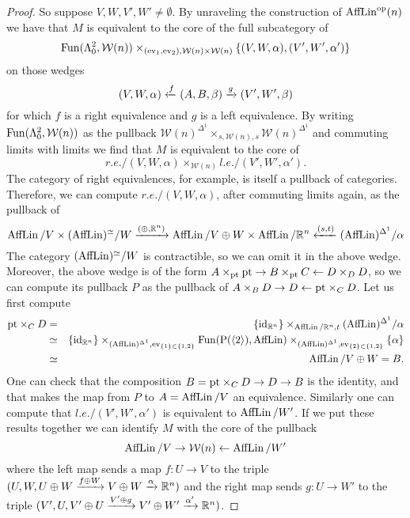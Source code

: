 \begin{proof}
    So suppose $V,W,V',W' \neq \emptyset$. By unraveling the construction of
    $\operatorname{AffLin}^{\mathrm{op}}(n)$ we have that $M$ is equivalent to the core of the
    full subcategory of
    \[
      \operatorname{Fun}(\Lambda^2_0, {\mathcal W(n)}) \times_{(\mathrm{ev}_1,\mathrm{ev}_2),
        {\mathcal W(n)}\times {\mathcal W(n)}} \{(V,W,\alpha),(V',W',\alpha')\}
    \]
    on those wedges
    \[
      (V,W,\alpha) \xleftarrow{f} (A,B,\beta) \xrightarrow{g} (V',W',\beta)
    \]
    for which $f$ is a right equivalence and $g$ is a left equivalence.
    By writing $ \operatorname{Fun}(\Lambda^2_0, {\mathcal W(n)}) $ as the
    pullback ${\mathcal W(n)}^{\Delta^1} \times_{s,{\mathcal W(n)},s} {\mathcal W(n)}^{\Delta^1}$
    and commuting limits with limits we find that $M$ is equivalent to the core of
    \[
      r.e./(V,W,\alpha) \times_{{\mathcal W(n)}} l.e./(V',W',\alpha').
    \]
    The category of right equivalences, for example,
    is itself a pullback of categories.
    Therefore, we can compute $r.e./(V,W,\alpha)$, after
    commuting limits again, as the pullback of
    \[
      \operatorname{AffLin}/V \times (\operatorname{AffLin})^\simeq/W \xrightarrow{(\oplus, \mathbb{R}^n)} \operatorname{AffLin}/V\oplus W \times
      \operatorname{AffLin}/\mathbb{R}^n \xleftarrow{(s,t)} (\operatorname{AffLin})^{\Delta^1}/\alpha
    \]
    The category $(\operatorname{AffLin})^\simeq/W$ is contractible, so we can omit it in the above wedge.
    Moreover, the above wedge is of the form
    $A \times_{\mathrm{pt}} \mathrm{pt} \to B \times_{\mathrm{pt}} C \leftarrow D \times_D D$,
    so we can compute its pullback $P$ as the
    pullback of  $A \times_B D \to D \leftarrow \mathrm{pt} \times_C D$.
    Let us first compute
    \begin{eqnarray*}
      \mathrm{pt} \times_C D &=& \{\mathrm{id}_{\mathbb{R}^n}\} \times_{\operatorname{AffLin}/\mathbb{R}^n,t} (\operatorname{AffLin})^{\Delta^1}/\alpha \\
      & \simeq & \{\mathrm{id}_{\mathbb{R}^n}\} \times_{(\operatorname{AffLin})^{\Delta^1}, \mathrm{ev}_{\{1\} \subset \{1,2\} }}
      \operatorname{Fun}(\mathrm{P}(\langle 2 \rangle), \operatorname{AffLin})
      \times_{(\operatorname{AffLin})^{\Delta^1}, \mathrm{ev}_{\{2\} \subset \{1,2\} }} \{\alpha \} \\
      & \simeq & \operatorname{AffLin} / V \oplus W  = B .
    \end{eqnarray*}
    One can check that the composition $B = \mathrm{pt} \times_C D \to D \to B$ is the identity,
    and that makes the map from $P$ to $A = \operatorname{AffLin}/V$ an equivalence.
    Similarly one can compute that $l.e./(V',W',\alpha')$ is equivalent to
    $\operatorname{AffLin}/W'$.
    If we put these results together we can identify $M$ with the core of the pullback
    \[
      \operatorname{AffLin}/V \to {\mathcal W(n)} \leftarrow \operatorname{AffLin}/W'
    \]
    where the left map sends a map $f\colon U \to V$ to the triple
    $(U,W, U\oplus W \xrightarrow{f \oplus W} V \oplus W \xrightarrow{\alpha} \mathbb{R}^n)$ and
    the right map sends $g \colon U \to W'$ to the triple
    $(V',U,V' \oplus U \xrightarrow{V' \oplus g} V' \oplus W' \xrightarrow{\alpha'} \mathbb{R}^n)$.
  

\end{proof}
